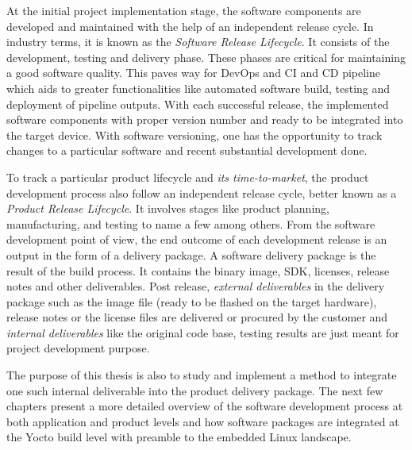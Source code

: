 At the initial project implementation stage, the software components are developed and maintained with the help of an independent release cycle. In industry terms, it is known as the \emph{Software Release Lifecycle}. It consists of the development, testing and delivery phase. These phases are critical for maintaining a good software quality. This paves way for DevOps and \ac{CI} and \ac{CD} pipeline which aids to greater functionalities like automated software build, testing and deployment of pipeline outputs. With each successful release, the implemented software components with proper version number and ready to be integrated into the target device. With software versioning, one has the opportunity to track changes to a particular software and recent substantial development done. 

To track a particular product lifecycle and \emph{its time-to-market}, the product development process also follow an independent release cycle, better known as a \emph{Product Release Lifecycle}. It involves stages like product planning, manufacturing, and testing to name a few among others. From the software development point of view, the end outcome of each development release is an output in the form of a delivery package. A software delivery package is the result of the build process. It contains the binary image, \ac{SDK}, licenses, release notes and other deliverables. Post release, \emph{external deliverables} in the delivery package such as the image file (ready to be flashed on the target hardware), release notes or the license files are delivered or procured by the customer and \emph{internal deliverables} like the original code base, testing results are just meant for project development purpose. 

The purpose of this thesis is also to study and implement a method to integrate one such internal deliverable into the product delivery package. The next few chapters present a more detailed overview of the software development process at both application and product levels and how software packages are integrated at the Yocto build level with preamble to the embedded Linux landscape.






